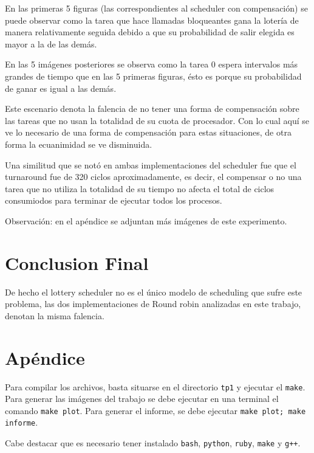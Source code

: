 \documentclass[a4paper]{article}
\begin{document}
En las primeras 5 figuras (las correspondientes al scheduler con
compensación) se puede observar como la tarea que hace llamadas bloqueantes
gana la lotería de manera relativamente seguida debido a que su probabilidad
de salir elegida es mayor a la de las demás.

En las 5 imágenes posteriores se observa como la tarea $0$ espera intervalos
más grandes de tiempo que en las 5 primeras figuras, ésto es porque su
probabilidad de ganar es igual a las demás.

Este escenario denota la falencia de no tener una forma de compensación
sobre las tareas que no usan la totalidad de su cuota de procesador. Con lo
cual aquí se ve lo necesario de una forma de compensación para estas
situaciones, de otra forma la ecuanimidad se ve disminuida.

Una similitud que se notó en ambas implementaciones del scheduler fue que el
turnaround fue de 320 ciclos aproximadamente, es decir, el compensar o no
una tarea que no utiliza la totalidad de su tiempo no afecta el total de
ciclos consumiodos para terminar de ejecutar todos los procesos.

Observación: en el apéndice se adjuntan más imágenes de este experimento.

\section{Conclusion Final}

De hecho el lottery scheduler no es el único modelo de scheduling que sufre
este problema, las dos implementaciones de Round robin analizadas en este
trabajo, denotan la misma falencia.

\section{Apéndice}

Para compilar los archivos, basta situarse en el directorio \verb|tp1| y
ejecutar el \verb|make|. Para generar las imágenes del trabajo se debe
ejecutar en una terminal el comando \verb|make plot|. Para generar el
informe, se debe ejecutar \verb|make plot; make informe|.

Cabe destacar que es necesario tener instalado \verb|bash|, \verb|python|,
\verb|ruby|, \verb|make| y \verb|g++|.
\end{document}
